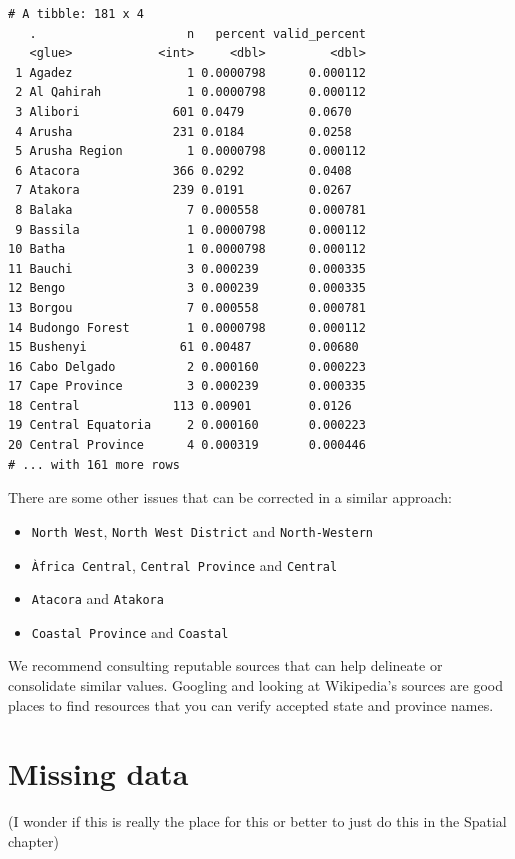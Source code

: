 \documentclass[
  letterpaper,
  DIV=11,
  numbers=noendperiod,
  oneside]{scrreprt}
\providecommand{\tightlist}{%
  \setlength{\itemsep}{0pt}\setlength{\parskip}{0pt}}\usepackage{longtable,booktabs,array}
\begin{document}
\begin{verbatim}
# A tibble: 181 x 4
   .                     n   percent valid_percent
   <glue>            <int>     <dbl>         <dbl>
 1 Agadez                1 0.0000798      0.000112
 2 Al Qahirah            1 0.0000798      0.000112
 3 Alibori             601 0.0479         0.0670  
 4 Arusha              231 0.0184         0.0258  
 5 Arusha Region         1 0.0000798      0.000112
 6 Atacora             366 0.0292         0.0408  
 7 Atakora             239 0.0191         0.0267  
 8 Balaka                7 0.000558       0.000781
 9 Bassila               1 0.0000798      0.000112
10 Batha                 1 0.0000798      0.000112
11 Bauchi                3 0.000239       0.000335
12 Bengo                 3 0.000239       0.000335
13 Borgou                7 0.000558       0.000781
14 Budongo Forest        1 0.0000798      0.000112
15 Bushenyi             61 0.00487        0.00680 
16 Cabo Delgado          2 0.000160       0.000223
17 Cape Province         3 0.000239       0.000335
18 Central             113 0.00901        0.0126  
19 Central Equatoria     2 0.000160       0.000223
20 Central Province      4 0.000319       0.000446
# ... with 161 more rows
\end{verbatim}

There are some other issues that can be corrected in a similar approach:

\begin{itemize}
\tightlist
\item
  \texttt{North\ West}, \texttt{North\ West\ District} and
  \texttt{North-Western}
\item
  \texttt{Àfrica\ Central}, \texttt{Central\ Province} and
  \texttt{Central}
\item
  \texttt{Atacora} and \texttt{Atakora}
\item
  \texttt{Coastal\ Province} and \texttt{Coastal}
\end{itemize}

We recommend consulting reputable sources that can help delineate or
consolidate similar values. Googling and looking at Wikipedia's sources
are good places to find resources that you can verify accepted state and
province names.

\hypertarget{missing-data}{%
\section{Missing data}\label{missing-data}}

(I wonder if this is really the place for this or better to just do this
in the Spatial chapter)
\end{document}
